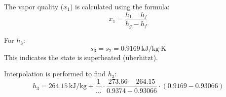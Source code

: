 The vapor quality (\(x_1\)) is calculated using the formula:  
\[
x_1 = \frac{h_1 - h_f}{h_g - h_f}
\]  

For \(h_3\):  
\[
s_3 = s_2 = 0.9169 \, \text{kJ/kg·K}
\]  
This indicates the state is superheated (\( \text{überhitzt} \)).  

Interpolation is performed to find \(h_3\):  
\[
h_3 = 264.15 \, \text{kJ/kg} + \frac{1}{\dots} \cdot \frac{273.66 - 264.15}{0.9374 - 0.93066} \cdot (0.9169 - 0.93066)
\]
